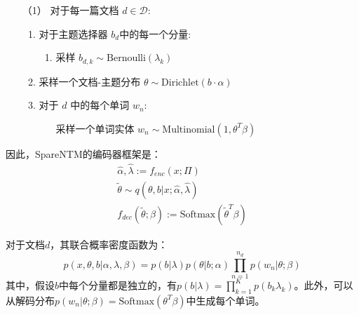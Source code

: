 \begin{enumerate}
	\item[（1）] 对于每一篇文档 $d \in \mathcal{D}$:
	\begin{enumerate}
		\item 对于主题选择器 $b_d$中的每一个分量:
		\begin{enumerate}
			\item 采样 $b_{d,k}\sim \mbox{Bernoulli}(\lambda_k)$
		\end{enumerate}
		\item 采样一个文档-主题分布 $\theta\sim \mbox{Dirichlet}(b\cdot\alpha)$
		\item 对于 $d$ 中的每个单词 $w_{n}$:
		\begin{enumerate}
			\item[] 采样一个单词实体 $w_n\sim \mbox{Multinomial}(1,\theta^{T}\beta)$
		\end{enumerate}
	\end{enumerate}
\end{enumerate}
因此，SpareNTM的编码器框架是：
\begin{align}
    \hat{\alpha},\hat{\lambda}:= f_{enc}(x;\Pi)\\
    \tilde{\theta}\sim q(\theta,b|x;\hat{\alpha},\hat{\lambda})\\
    f_{dec}(\tilde{\theta};\beta):=\mbox{Softmax}(\tilde{\theta}^{T}\beta) 
\end{align}

对于文档$d$，其联合概率密度函数为：
\begin{equation}
	\label{spLDA_joint}
	p(x,\theta,b\vert\alpha,\lambda,\beta)=p(b\vert\lambda)p(\theta\vert b;\alpha)\prod_{n=1}^{n_d} p(w_n\vert\theta;\beta)
\end{equation}
其中，假设$b$中每个分量都是独立的，有$p(b\vert\lambda)=\prod_{k=1}^{K}p(b_k\lambda_k)$。此外，可以从解码分布$p(w_n\vert\theta;\beta)=\mbox{Softmax}(\theta^T\beta)$中生成每个单词。

